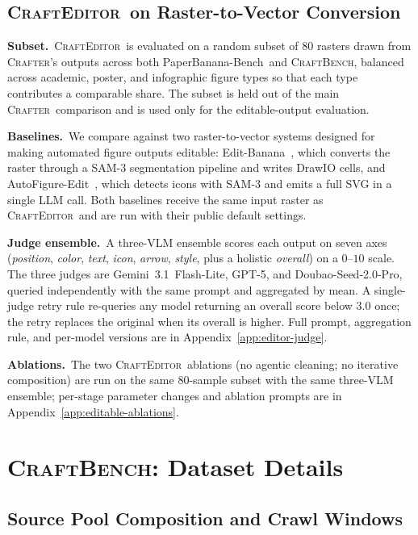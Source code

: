 \documentclass{llmxive}
\providecommand{\Crafter}{\textsc{Crafter}\xspace}
\providecommand{\Editor}{\textsc{CraftEditor}\xspace}
\providecommand{\CrafterBench}{\textsc{CraftBench}\xspace}
\providecommand{\PaperBananaBench}{PaperBanana-Bench\xspace}
\begin{document}
\subsection{\Editor\ on Raster-to-Vector Conversion}
\label{app:setup-editor}

\noindent\textbf{Subset.}\
\Editor\ is evaluated on a random subset of $80$ rasters drawn from \Crafter's outputs across both \PaperBananaBench\ and \CrafterBench, balanced across academic, poster, and infographic figure types so that each type contributes a comparable share. The subset is held out of the main \Crafter\ comparison and is used only for the editable-output evaluation.

\noindent\textbf{Baselines.}\
We compare against two raster-to-vector systems designed for making automated figure outputs editable: Edit-Banana~\citep{editbanana2026}, which converts the raster through a SAM-3 segmentation pipeline and writes DrawIO cells, and AutoFigure-Edit~\citep{lin2026autofigureedit}, which detects icons with SAM-3 and emits a full SVG in a single LLM call. Both baselines receive the same input raster as \Editor\ and are run with their public default settings.

\noindent\textbf{Judge ensemble.}\
A three-VLM ensemble scores each output on seven axes (\textit{position}, \textit{color}, \textit{text}, \textit{icon}, \textit{arrow}, \textit{style}, plus a holistic \textit{overall}) on a $0$--$10$ scale. The three judges are Gemini~3.1~Flash-Lite, GPT-5, and Doubao-Seed-2.0-Pro, queried independently with the same prompt and aggregated by mean. A single-judge retry rule re-queries any model returning an overall score below $3.0$ once; the retry replaces the original when its overall is higher. Full prompt, aggregation rule, and per-model versions are in Appendix~\ref{app:editor-judge}.

\noindent\textbf{Ablations.}\
The two \Editor\ ablations (no agentic cleaning; no iterative composition) are run on the same $80$-sample subset with the same three-VLM ensemble; per-stage parameter changes and ablation prompts are in Appendix~\ref{app:editable-ablations}.



\section{\CrafterBench: Dataset Details}
\label{app:bench-details}

\subsection{Source Pool Composition and Crawl Windows}
\label{sec:bench-sources}
\end{document}
